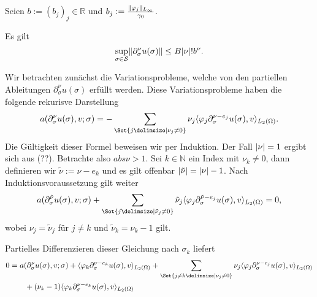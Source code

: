 Seien $b := (b_{j})_{j} \in \mathbb{R}$ und $b_{j} := \frac{\lVert\varphi_{j}\rVert_{L_{\infty}}}{\gamma_{0}}$.

\begin{Satz}
    Es gilt
    \begin{equation}
        \sup_{\sigma \in \mathcal S} \lVert\partial^{\nu}_{\sigma} u(\sigma)\rVert \leq B \lvert\nu\rvert! b^{\nu}.
    \end{equation}

    \begin{Beweis}
        Wir betrachten zunächst die Variationsprobleme, welche von den partiellen Ableitungen $\partial^{\nu}_{\sigma} u(\sigma)$ erfüllt werden.
        Diese Variationsprobleme haben die folgende rekurisve Darstellung
        \begin{equation}
            a(\partial^{\nu}_{\sigma} u(\sigma), v; \sigma)
            = - \sum_{\Set{j \given \nu_{j} \neq 0}} \nu_{j} \skp{\varphi_{j} \partial^{\nu - e_{j}}_{\sigma} u(\sigma)}{v}{L_{2}(\Omega)}.
        \end{equation}
        Die Gültigkeit dieser Formel beweisen wir per Induktion.
        Der Fall $\lvert\nu\rvert = 1$ ergibt sich aus (??).
        Betrachte also $abs{\nu} > 1$.
        Sei $k \in \mathbb{N}$ ein Index mit $\nu_{k} \neq 0$, dann definieren wir $\tilde{\nu} := \nu - e_{k}$ und es gilt offenbar $\lvert\tilde{\nu}\rvert = \lvert\nu\rvert - 1$.
        Nach Induktionsvoraussetzung gilt weiter
        \begin{equation}
            a(\partial^{\tilde{\nu}}_{\sigma} u(\sigma), v; \sigma) + \sum_{\Set{j \given \tilde{\nu}_{j} \neq 0}} \tilde{\nu}_{j} \skp{\varphi_{j} \partial^{\tilde{\nu} - e_{j}}_{\sigma} u(\sigma)}{v}{L_{2}(\Omega)} = 0,
        \end{equation}
        wobei $\nu_{j} = \tilde{\nu}_{j}$ für $j \neq k$ und $\tilde{\nu}_{k} = \nu_{k} - 1$ gilt.

        Partielles Differenzieren dieser Gleichung nach $\sigma_{k}$ liefert
        \begin{align}
            0 &=
                a(\partial^{\nu}_{\sigma} u(\sigma), v; \sigma)
                + \skp{\varphi_{k} \partial^{\nu - e_{k}}_{\sigma} u(\sigma)}{v}{L_{2}(\Omega)}
                + \sum_{\Set{j \neq k \given \nu_{j} \neq 0}} \nu_{j} \skp{\varphi_{j} \partial^{\nu - e_{j}}_{\sigma} u(\sigma)}{v}{L_{2}(\Omega)}
            \\&\qquad     + (\nu_{k} - 1) \skp{\varphi_{k} \partial^{\nu - e_{k}}_{\sigma} u(\sigma) }{v}{L_{2}(\Omega)}
        \end{align}


\end{Beweis}
\end{Satz}
